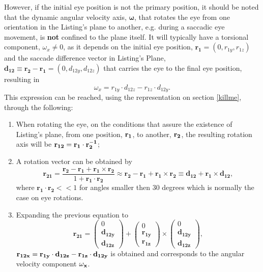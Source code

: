 However, if the initial eye position is not the primary position, it should be noted that the dynamic angular velocity axis, $ \mathbf{\omega}$, that rotates the eye from one orientation in the Listing's plane to another, e.g. during a saccadic eye movement, is {\bf not} confined to the plane itself. It will typically have a torsional component, $\omega_x \neq 0$, as it depends on the initial eye position, $ \mathbf{r_1}  = (0, r_{1y}, r_{1z})$ and the saccade difference vector in Listing's Plane, $\mathbf{d_{12} }\equiv \mathbf{r_2} - \mathbf{r_1} = (0, d_{12y},d_{12z})$ that carries the eye to the final eye position, resulting in
\begin{equation}
\omega _x = r_{1y} \cdot d_{12z} - r_{1z} \cdot d_{12y}.
\end{equation} 
This expression can be reached, using the representation on section \ref{killme}, through the following:
\begin{enumerate}
	\item When rotating the eye, on the conditions that assure the existence of Listing's plane, from one position, $\bf r_1$, to another, $\bf r_2$, the resulting rotation axis will be $\bf r_{12} = r_1  \cdot r_2^{-1}$;
	\item A rotation vector can be obtained by
	\begin{equation}
	\mathbf{r _ { 21 } } = \frac { \mathbf{r _ { 2 }} - \mathbf{r _ { 1 } }+ \mathbf{r _ { 1 }} \times \mathbf{r _ { 2 } }} { 1 + \mathbf{r _ { 1 }} \cdot \mathbf{r _ { 2 } }} \approx \mathbf{r _ { 2 }} - \mathbf{r _ { 1 }} + \mathbf{r _ { 1 }} \times \mathbf{r _ { 2 }} \equiv \mathbf{d _ { 12 }} + \mathbf{r _ { 1 } }\times \mathbf{d_{12 }} ,
	\end{equation}
	where $\mathbf{r _ { 1 }} \cdot \mathbf{r _ { 2 }} << 1$ for angles smaller then 30 degrees which is normally the case on eye rotations.
	\item Expanding the previous equation to
	\begin{equation}
	\mathbf{r _ { 21 }} = 
	\left( \begin{array} { c } { 0 } \\ \mathbf{{ d_{12y}}} \\ \mathbf{{d_{12z}}}\end{array}\right) +  \left( \begin{array} { c } { 0 } \\ \mathbf{{ r _ { 1 y } }} \\ \mathbf{{ r _ { 1 z }  }}\end{array}\right) 
	\times \left( \begin{array} { c } { 0 } \\ \mathbf{{ d_{12y}}} \\ \mathbf{{ d_{12z} }}  \end{array} \right),
	\end{equation}
	$\bf r_{12x} = r_{1y} \cdot d_{12z} - r_{1z} \cdot d_{12y}$ is obtained and corresponds to the angular velocity component $\bf \omega_x$.
\end{enumerate}
\cite{donders} \cite{eye}